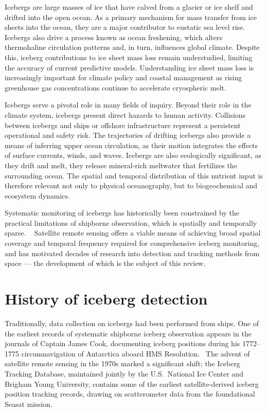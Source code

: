 \documentclass[11pt, letterpaper]{article}
\begin{document}
Icebergs are large masses of ice that have calved from a glacier or ice shelf and 
drifted into the open ocean. As a primary mechanism for mass transfer from ice 
sheets into the ocean, they are a major contributor to eustatic sea level rise. 
Icebergs also drive a process known as ocean freshening, which alters thermohaline 
circulation patterns and, in turn, influences global climate. Despite this, iceberg 
contributions to ice sheet mass loss remain understudied, limiting the accuracy of 
current predictive models. Understanding ice sheet mass loss is increasingly 
important for climate policy and coastal management as rising greenhouse gas 
concentrations continue to accelerate cryospheric melt.~\parencite{koo2021, koo2023, otosaka2023, fisser2025}

Icebergs serve a pivotal role in many fields of inquiry. Beyond their role in the climate system, icebergs present direct hazards to human activity. Collisions between icebergs and ships or offshore infrastructure represent a persistent operational and safety risk. The trajectories of drifting icebergs also provide a means of inferring upper ocean circulation, as their motion integrates the effects of surface currents, winds, and waves. Icebergs are also ecologically significant, as they drift and melt, they release mineral-rich meltwater that fertilizes the surrounding ocean. The spatial and temporal distribution of this nutrient input is therefore relevant not only to physical oceanography, but to biogeochemical and ecosystem dynamics.~\parencite{long_icebergs_2002, koo2023, karvonen_etal_2021}

Systematic monitoring of icebergs has historically been constrained by the 
practical limitations of shipborne observation, which is spatially and temporally 
sparse. ~\parencite{koo2023, long_icebergs_2002} Satellite remote sensing offers a viable means of achieving broad spatial coverage and temporal frequency required for comprehensive iceberg monitoring, and has motivated decades of research into detection and tracking methods from space --- the development of which is the subject of this review.

\section{History of iceberg detection}

Traditionally, data collection on icebergs had been performed from ships. One of the earliest records of systematic shipborne iceberg observation appears in the journals of Captain James Cook, documenting iceberg positions during his 1772--1775 
circumnavigation of Antarctica aboard HMS Resolution.~\parencite{hollingshead_antarctic_icebergs} The advent of satellite remote sensing in the 1970s marked a significant shift; the Iceberg Tracking Database, maintained jointly by the U.S.\ National Ice Center and Brigham Young University, contains some of the earliest satellite-derived iceberg position tracking records, drawing on scatterometer data from the foundational Seasat mission.~\parencite{budge_long_2017} 
\end{document}
